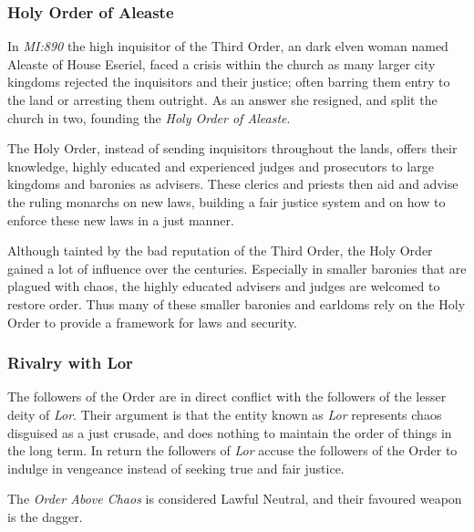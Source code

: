 \subsubsection*{Holy Order of Aleaste}

In \emph{MI:890} the high inquisitor of the Third Order, an dark elven woman
named Aleaste of House Eseriel, faced a crisis within the church as many
larger city kingdoms rejected the inquisitors and their justice; often barring
them entry to the land or arresting them outright. As an answer she resigned,
and split the church in two, founding the \emph{Holy Order of Aleaste}.

The Holy Order, instead of sending inquisitors throughout the lands, offers
their knowledge, highly educated and experienced judges and prosecutors to
large kingdoms and baronies as advisers. These clerics and priests then aid
and advise the ruling monarchs on new laws, building a fair justice system and
on how to enforce these new laws in a just manner.

Although tainted by the bad reputation of the Third Order, the Holy Order
gained a lot of influence over the centuries. Especially in smaller baronies
that are plagued with chaos, the highly educated advisers and judges are
welcomed to restore order. Thus many of these smaller baronies and earldoms
rely on the Holy Order to provide a framework for laws and security.

\subsubsection*{Rivalry with Lor}

The followers of the Order are in direct conflict with the followers of the
lesser deity of \emph{Lor}. Their argument is that the entity known as
\emph{Lor} represents chaos disguised as a just crusade, and does nothing to
maintain the order of things in the long term. In return the followers of
\emph{Lor} accuse the followers of the Order to indulge in vengeance instead
of seeking true and fair justice.

\begin{35e}
  The \emph{Order Above Chaos} is considered Lawful Neutral, and their favoured
  weapon is the dagger.
\end{35e}
